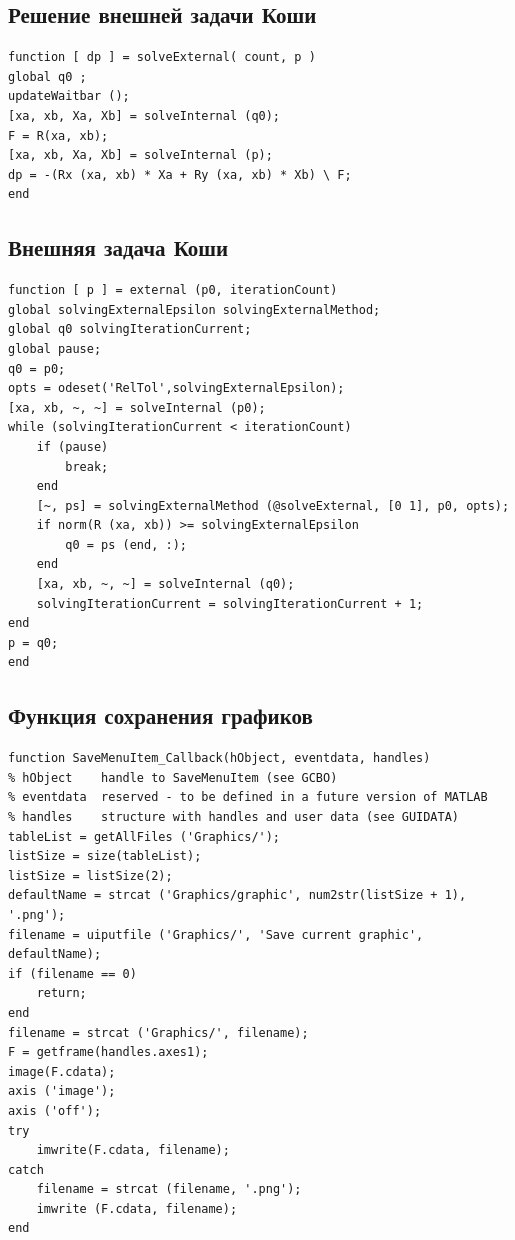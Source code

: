 \subsection{Решение внешней задачи Коши}
\lstset{language=Matlab}  
\begin{lstlisting}
function [ dp ] = solveExternal( count, p )
global q0 ;
updateWaitbar ();
[xa, xb, Xa, Xb] = solveInternal (q0);
F = R(xa, xb);
[xa, xb, Xa, Xb] = solveInternal (p);
dp = -(Rx (xa, xb) * Xa + Ry (xa, xb) * Xb) \ F;
end
\end{lstlisting}

\subsection{Внешняя задача Коши}
\lstset{language=Matlab}  
\begin{lstlisting}
function [ p ] = external (p0, iterationCount)
global solvingExternalEpsilon solvingExternalMethod;
global q0 solvingIterationCurrent;
global pause;
q0 = p0;
opts = odeset('RelTol',solvingExternalEpsilon);
[xa, xb, ~, ~] = solveInternal (p0);
while (solvingIterationCurrent < iterationCount)  
    if (pause)
        break;
    end
    [~, ps] = solvingExternalMethod (@solveExternal, [0 1], p0, opts);
    if norm(R (xa, xb)) >= solvingExternalEpsilon   
        q0 = ps (end, :);
    end
    [xa, xb, ~, ~] = solveInternal (q0);
    solvingIterationCurrent = solvingIterationCurrent + 1;
end
p = q0;
end
\end{lstlisting}

\subsection{Функция сохранения графиков}
\lstset{language=Matlab}  
\begin{lstlisting}
function SaveMenuItem_Callback(hObject, eventdata, handles)
% hObject    handle to SaveMenuItem (see GCBO)
% eventdata  reserved - to be defined in a future version of MATLAB
% handles    structure with handles and user data (see GUIDATA)
tableList = getAllFiles ('Graphics/');
listSize = size(tableList);
listSize = listSize(2);
defaultName = strcat ('Graphics/graphic', num2str(listSize + 1), '.png');
filename = uiputfile ('Graphics/', 'Save current graphic', defaultName);
if (filename == 0)
    return;
end
filename = strcat ('Graphics/', filename);
F = getframe(handles.axes1);
image(F.cdata);
axis ('image');
axis ('off');
try
    imwrite(F.cdata, filename);
catch
    filename = strcat (filename, '.png');
    imwrite (F.cdata, filename);
end
\end{lstlisting}
\newpage


